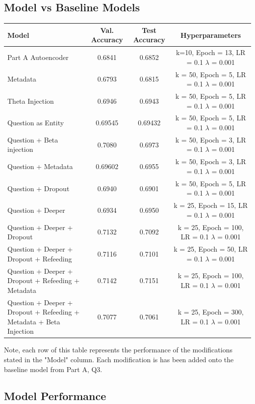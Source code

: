 \documentclass{article}
\begin{document}
\subsection{Model vs Baseline Models}
\begin{table}[htbp!]
\centering
\begin{tabular}{|m{5cm}|c|c|c|}
\hline
Model & Val. Accuracy & Test Accuracy & Hyperparameters \\
\hline
Part A Autoencoder & 0.6841 & 0.6852 & k=10, Epoch = 13, LR = 0.1 $\lambda$ = 0.001 \\
\hline
Metadata & 0.6793 & 0.6815 & k = 50, Epoch = 5, LR = 0.1 $\lambda$ = 0.001\\
\hline
Theta Injection & 0.6946 & 0.6943 & k = 50, Epoch = 5, LR = 0.1 $\lambda$ = 0.001\\
\hline
Question as Entity & 0.69545 & 0.69432 & k = 50, Epoch = 5, LR = 0.1 $\lambda$ = 0.001\\
\hline
Question + Beta injection & 0.7080 & 0.6973 & k = 50, Epoch = 3, LR = 0.1 $\lambda$ = 0.001\\
\hline
Question + Metadata& 0.69602 & 0.6955 & k = 50, Epoch = 3, LR = 0.1 $\lambda$ = 0.001\\
\hline
Question + Dropout & 0.6940 & 0.6901 & k = 50, Epoch = 5, LR = 0.1 $\lambda$ = 0.001\\
\hline
Question + Deeper & 0.6934 & 0.6950 & k = 25, Epoch = 15, LR = 0.1 $\lambda$ = 0.001\\
\hline
Question + Deeper + Dropout & 0.7132 & 0.7092 & k = 25, Epoch = 100, LR = 0.1 $\lambda$ = 0.001\\
\hline
 Question + Deeper + Dropout + Refeeding& 0.7116 & 0.7101 & k = 25, Epoch = 50, LR = 0.1 $\lambda$ = 0.001\\
 \hline
Question + Deeper + Dropout + Refeeding + Metadata& 0.7142 & 0.7151 & k = 25, Epoch = 100, LR = 0.1 $\lambda$ = 0.001\\
 \hline
Question + Deeper + Dropout + Refeeding + Metadata + Beta Injection & 0.7077 & 0.7061 & k = 25, Epoch = 300, LR = 0.1 $\lambda$ = 0.001\\
 \hline
\end{tabular}
\end{table}
Note, each row of this table represents the performance of the modifications stated in the "Model" column. Each modification is has been added onto the baseline model from Part A, Q3.\\
\subsection{Model Performance}
\end{document}
